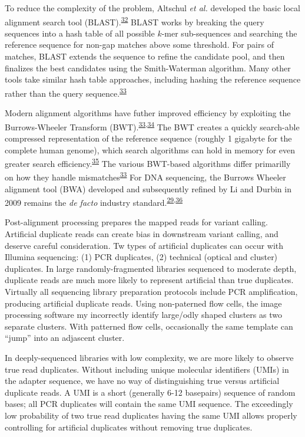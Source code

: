 \documentclass[11pt,letterpaper]{book}
\begin{document}
To reduce the complexity of the problem, Altschul \emph{et al.} developed the basic local alignment search tool (BLAST).\textsuperscript{\protect\hyperlink{ref-altschul:1990aa}{32}}
BLAST works by breaking the query sequences into a hash table of all possible \(k\)-mer sub-sequences and searching the reference sequence for non-gap matches above some threshold.
For pairs of matches, BLAST extends the sequence to refine the candidate pool, and then finalizes the best candidates using the Smith-Waterman algorithm.
Many other tools take similar hash table approaches, including hashing the reference sequence rather than the query sequence.\textsuperscript{\protect\hyperlink{ref-li:2010aa}{33}}

Modern alignment algorithms have futher improved efficiency by exploiting the Burrows-Wheeler Transform (BWT).\textsuperscript{\protect\hyperlink{ref-li:2010aa}{33},\protect\hyperlink{ref-burrows:1994aa}{34}}
The BWT creates a quickly search-able compressed representation of the reference sequence (roughly 1 gigabyte for the complete human genome), which search algorithms can hold in memory for even greater search efficiency.\textsuperscript{\protect\hyperlink{ref-lam:2008aa}{35}}
The various BWT-based algorithms differ primarilly on how they handle mismatches\textsuperscript{\protect\hyperlink{ref-li:2010aa}{33}}
For DNA sequencing, the Burrows Wheeler alignment tool (BWA) developed and subsequently refined by Li and Durbin in 2009 remains the \emph{de facto} industry standard.\textsuperscript{\protect\hyperlink{ref-li:2009aa}{29},\protect\hyperlink{ref-li:2010ab}{36}}

Post-alignment processing prepares the mapped reads for variant calling.
Artificial duplicate reads can create bias in downstream variant calling, and deserve careful consideration.
Tw types of artificial duplicates can occur with Illumina sequencing: (1) PCR duplicates, (2) technical (optical and cluster) duplicates.
In large randomly-fragmented libraries sequenced to moderate depth, duplicate reads are much more likely to represent artificial than true duplicates.
Virtually all sequencing library preparation protocols include PCR amplification, producing artificial duplicate reads.
Using non-paterned flow cells, the image processing software my incorrectly identify large/odly shaped clusters as two separate clusters.
With patterned flow cells, occasionally the same template can ``jump'' into an adjascent cluster.

In deeply-sequenced libraries with low complexity, we are more likely to observe true read duplicates.
Without including unique molecular identifiers (UMIs) in the adapter sequence, we have no way of distinguishing true versus artificial duplicate reads.
A UMI is a short (generally 6-12 basepairs) sequence of random bases; all PCR duplicates will contain the same UMI sequence.
The exceedingly low probability of two true read duplicates having the same UMI allows properly controlling for artificial duplicates without removing true duplicates.
\end{document}
